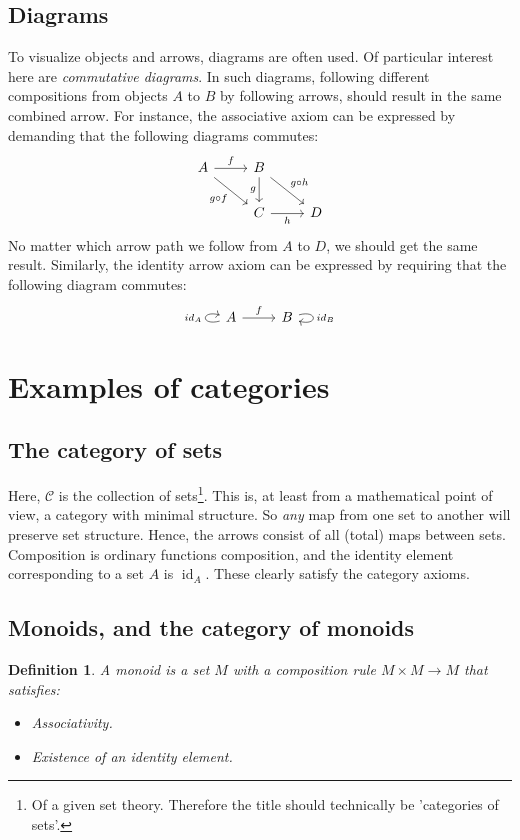 \documentclass[12pt, a4paper]{article}
\newtheorem{definition}{Definition}[section]
\numberwithin{equation}{section}
\DeclareMathOperator{\id}{id}
\begin{document}
\subsection{Diagrams}
To visualize objects and arrows, diagrams are often used. Of particular interest here are \textit{commutative diagrams}. In such diagrams, following different compositions from objects $A$ to $B$ by following arrows, should result in the same combined arrow. For instance, the associative axiom can be expressed by demanding that the following diagrams commutes:
\begin{equation*}
\begin{tikzcd}
A\arrow[r, "f"]
\arrow[dr, swap, "g\circ f"]
&
B\arrow[dr, "g\circ h"]
\arrow[d, swap, "g"]
\\
{}&
C\arrow[r, swap, "h"]
&
D
\end{tikzcd}
\end{equation*}
No matter which arrow path we follow from $A$ to $D$, we should get the same result. Similarly, the identity arrow axiom can be expressed by requiring that the following diagram commutes:
\begin{equation*}
\begin{tikzcd}
A\arrow[r, "f"]
\arrow[loop left,"id_A"] &
B\arrow[loop right,"id_B"]
\end{tikzcd}
\end{equation*}

\section{Examples of categories}

\subsection{The category of sets}
Here, $\mathcal{C}$ is the collection of sets\footnote{Of a given set theory. Therefore the title should technically be 'categories of sets'.}. This is, at least from a mathematical point of view, a category with minimal structure. So \textit{any} map from one set to another will preserve set structure. Hence, the arrows consist of all (total) maps between sets. Composition is ordinary functions composition, and the identity element corresponding to a set $A$ is $\id_A$. These clearly satisfy the category axioms.

\subsection{Monoids, and the category of monoids}
\begin{definition}
A monoid is a set $M$ with a composition rule $M\times M\rightarrow M$ that satisfies:
\begin{itemize}
\item Associativity.
\item Existence of an identity element.
\end{itemize}
\end{definition}
\end{document}
